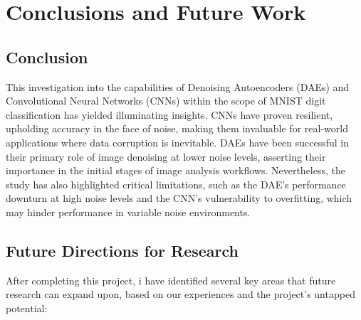 \chapter{Conclusions and Future Work}
\label{ch:con}
\section{Conclusion}
This investigation into the capabilities of Denoising Autoencoders (DAEs) and Convolutional Neural Networks (CNNs) within the scope of MNIST digit classification has yielded illuminating insights. CNNs have proven resilient, upholding accuracy in the face of noise, making them invaluable for real-world applications where data corruption is inevitable. DAEs have been successful in their primary role of image denoising at lower noise levels, asserting their importance in the initial stages of image analysis workflows. Nevertheless, the study has also highlighted critical limitations, such as the DAE’s performance downturn at high noise levels and the CNN’s vulnerability to overfitting, which may hinder performance in variable noise environments.

\section{Future Directions for Research}

After completing this project, i have identified several key areas that future research can expand upon, based on our experiences and the project's untapped potential:

